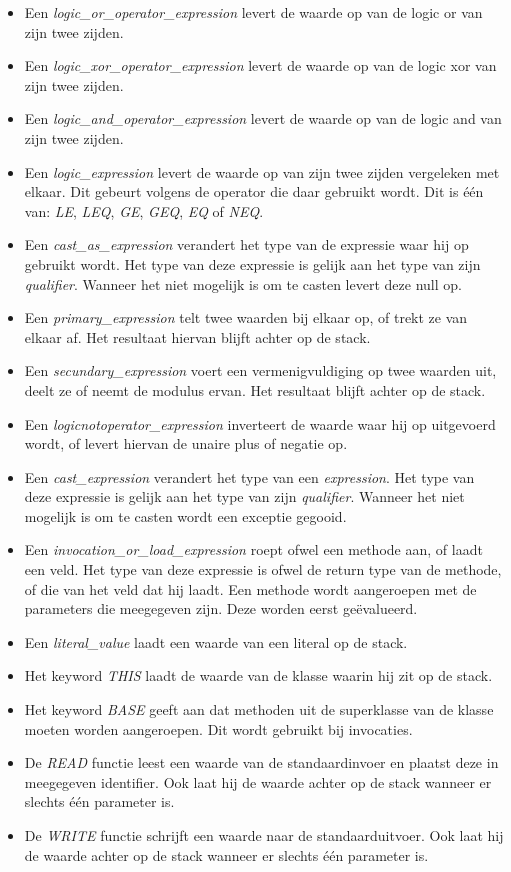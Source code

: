 \begin{itemize}
	\item Een \textit{logic\_or\_operator\_expression} levert de waarde op van de logic or van zijn twee zijden.
	\item Een \textit{logic\_xor\_operator\_expression} levert de waarde op van de logic xor van zijn twee zijden.
	\item Een \textit{logic\_and\_operator\_expression} levert de waarde op van de logic and van zijn twee zijden.
	\item Een \textit{logic\_expression} levert de waarde op van zijn twee zijden vergeleken met elkaar. Dit gebeurt volgens de operator die daar gebruikt wordt. Dit is \'e\'en van: \textit{LE}, \textit{LEQ}, \textit{GE}, \textit{GEQ}, \textit{EQ} of \textit{NEQ}.
	\item Een \textit{cast\_as\_expression} verandert het type van de expressie waar hij op gebruikt wordt. Het type van deze expressie is gelijk aan het type van zijn \textit{qualifier}. Wanneer het niet mogelijk is om te casten levert deze null op.
	\item Een \textit{primary\_expression} telt twee waarden bij elkaar op, of trekt ze van elkaar af. Het resultaat hiervan blijft achter op de stack.
	\item Een \textit{secundary\_expression} voert een vermenigvuldiging op twee waarden uit, deelt ze of neemt de modulus ervan. Het resultaat blijft achter op de stack.
	\item Een \textit{logicnotoperator\_expression} inverteert de waarde waar hij op uitgevoerd wordt, of levert hiervan de unaire plus of negatie op.
	\item Een \textit{cast\_expression} verandert het type van een \textit{expression}. Het type van deze expressie is gelijk aan het type van zijn \textit{qualifier}. Wanneer het niet mogelijk is om te casten wordt een exceptie gegooid.
	\item Een \textit{invocation\_or\_load\_expression} roept ofwel een methode aan, of laadt een veld. Het type van deze expressie is ofwel de return type van de methode, of die van het veld dat hij laadt. Een methode wordt aangeroepen met de parameters die meegegeven zijn. Deze worden eerst ge\"evalueerd.
	\item Een \textit{literal\_value} laadt een waarde van een literal op de stack.
	\item Het keyword \textit{THIS} laadt de waarde van de klasse waarin hij zit op de stack.
	\item Het keyword \textit{BASE} geeft aan dat methoden uit de superklasse van de klasse moeten worden aangeroepen. Dit wordt gebruikt bij invocaties.
	\item De \textit{READ} functie leest een waarde van de standaardinvoer en plaatst deze in meegegeven identifier. Ook laat hij de waarde achter op de stack wanneer er slechts \'e\'en parameter is.
	\item De \textit{WRITE} functie schrijft een waarde naar de standaarduitvoer. Ook laat hij de waarde achter op de stack wanneer er slechts \'e\'en parameter is.
\end{itemize}

